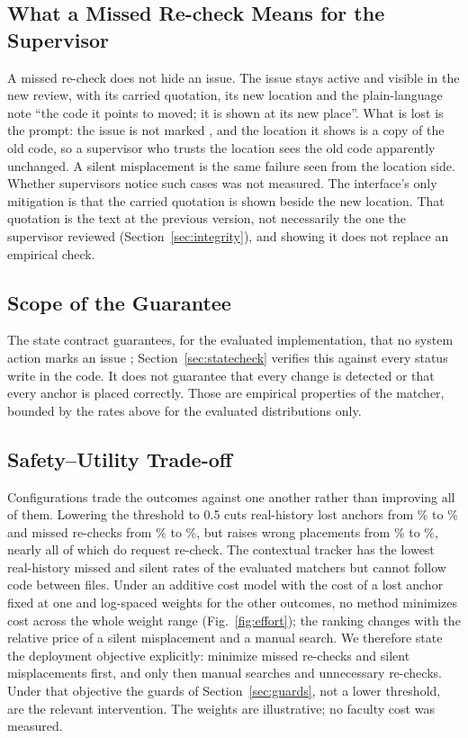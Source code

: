 \subsection{What a Missed Re-check Means for the Supervisor}
A missed re-check does not hide an issue. The issue stays active and visible in the new review, with its carried quotation, its new location and the plain-language note ``the code it points to moved; it is shown at its new place''. What is lost is the prompt: the issue is not marked , and the location it shows is a copy of the old code, so a supervisor who trusts the location sees the old code apparently unchanged. A silent misplacement is the same failure seen from the location side. Whether supervisors notice such cases was not measured. The interface's only mitigation is that the carried quotation is shown beside the new location. That quotation is the text at the previous version, not necessarily the one the supervisor reviewed (Section~\ref{sec:integrity}), and showing it does not replace an empirical check.

\subsection{Scope of the Guarantee}
The state contract guarantees, for the evaluated implementation, that no system action marks an issue ; Section~\ref{sec:statecheck} verifies this against every status write in the code. It does not guarantee that every change is detected or that every anchor is placed correctly. Those are empirical properties of the matcher, bounded by the rates above for the evaluated distributions only.

\subsection{Safety--Utility Trade-off}
Configurations trade the outcomes against one another rather than improving all of them. Lowering the threshold to 0.5 cuts real-history lost anchors from \smRealCasLostPct\% to \smRealCalLostPct\% and missed re-checks from \smRealCasMissPct\% to \smRealCalMissPct\%, but raises wrong placements from \smRealCasWrongPct\% to \smRealCalWrongPct\%, nearly all of which do request re-check. The contextual tracker has the lowest real-history missed and silent rates of the evaluated matchers but cannot follow code between files. Under an additive cost model with the cost of a lost anchor fixed at one and log-spaced weights for the other outcomes, no method minimizes cost across the whole weight range (Fig.~\ref{fig:effort}); the ranking changes with the relative price of a silent misplacement and a manual search. We therefore state the deployment objective explicitly: minimize missed re-checks and silent misplacements first, and only then manual searches and unnecessary re-checks. Under that objective the guards of Section~\ref{sec:guards}, not a lower threshold, are the relevant intervention. The weights are illustrative; no faculty cost was measured.
